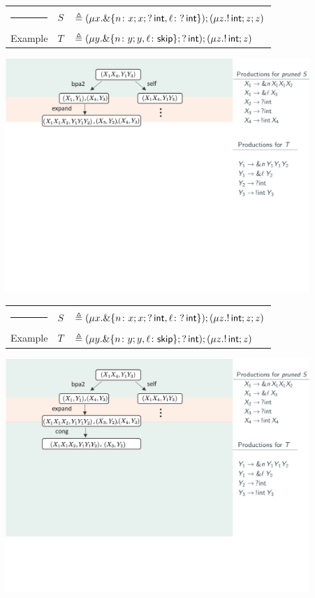 \message{ !name(main.tex)}\documentclass[10pt]{beamer}
\begin{document}
\begin{frame}
	\begin{tabular} {l l l }
  		{\color{teal}\rule{3cm}{2pt}} &  $S$ &$\triangleq (\mu x. \&\{n\colon x;x;?\,\mathsf{int},
      \ell\colon ?\,\mathsf{int} \});( \mu z. !\,\mathsf{int}; z;z )$\\
  		{\color{teal} Example}  &  $T$ &$\triangleq (\mu y. \&\{n\colon y;y,
      \ell\colon \mathsf{skip} \}; ?\,\mathsf{int}); (\mu z. !\,\mathsf{int}; z)$
	\end{tabular}
	\vspace*{2mm}
	\includegraphics[width=11.5cm]{img/exemplo-7}\smallskip
\end{frame}

\begin{frame}
	\begin{tabular} {l l l }
  		{\color{teal}\rule{3cm}{2pt}} &  $S$ &$\triangleq (\mu x. \&\{n\colon x;x;?\,\mathsf{int},
      \ell\colon ?\,\mathsf{int} \});( \mu z. !\,\mathsf{int}; z;z )$\\
 		{\color{teal} Example}  &  $T$ &$\triangleq (\mu y. \&\{n\colon y;y,
      \ell\colon \mathsf{skip} \}; ?\,\mathsf{int}); (\mu z. !\,\mathsf{int}; z)$
	\end{tabular}
	\vspace*{2mm}
	\includegraphics[width=11.5cm]{img/exemplo-6}\smallskip
\end{frame}
\end{document}

